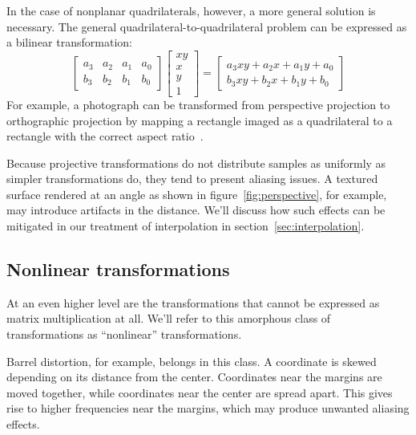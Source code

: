\documentclass[english,12pt]{ifimaster}
\begin{document}
In the case of nonplanar quadrilaterals, however, a more general
solution is necessary. The general quadrilateral-to-quadrilateral
problem can be expressed as a bilinear transformation:
\begin{equation}
  \left[\begin{matrix}
      a_3 & a_2 & a_1 & a_0\\
      b_3 & b_2 & b_1 & b_0
    \end{matrix}\right]
  \left[\begin{matrix}
      xy\\
      x\\
      y\\
      1
    \end{matrix}\right]
  =
  \left[\begin{matrix}
      a_3xy + a_2x + a_1y + a_0\\
      b_3xy + b_2x + b_1y + b_0
    \end{matrix}\right]
\end{equation}
For example, a photograph can be transformed from perspective
projection to orthographic projection by mapping a rectangle imaged as
a quadrilateral to a rectangle with the correct aspect
ratio~\citep{zisserman04:-multiple-view}.




Because projective transformations do not distribute samples as
uniformly as simpler transformations do, they tend to present aliasing
issues. A textured surface rendered at an angle as shown in
figure~\ref{fig:perspective}, for example, may introduce artifacts in
the distance. We'll discuss how such effects can be mitigated in our
treatment of interpolation in section~\ref{sec:interpolation}.

\subsection{Nonlinear transformations}
\label{sec:nonlinear}

At an even higher level are the transformations that cannot be
expressed as matrix multiplication at all. We'll refer to this
amorphous class of transformations as ``nonlinear'' transformations.

Barrel distortion, for example, belongs in this class. A coordinate is
skewed depending on its distance from the center. Coordinates near the
margins are moved together, while coordinates near the center are
spread apart. This gives rise to higher frequencies near the margins,
which may produce unwanted aliasing effects.
\end{document}
